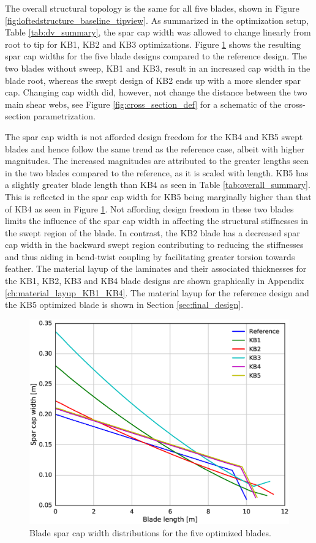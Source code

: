The overall structural topology is the same for all five blades, shown in Figure \ref{fig:loftedstructure_baseline_tipview}.
As summarized in the optimization setup, Table \ref{tab:dv_summary}, the spar cap width was allowed to change linearly from root to tip for KB1, KB2 and KB3 optimizations. Figure \ref{fig:capwidth} shows the resulting spar cap widths for the five blade designs compared to the reference design.
The two blades without sweep, KB1 and KB3, result in an increased cap width in the blade root, whereas the swept design of KB2 ends up with a more slender spar cap. Changing cap width did, however, not change the distance between the two main shear webs, see Figure \ref{fig:cross_section_def} for a schematic of the cross-section parametrization.

The spar cap width is not afforded design freedom for the KB4 and KB5 swept blades and hence follow the same trend as the reference case, albeit with higher magnitudes. The increased magnitudes are attributed to the greater lengths seen in the two blades compared to the reference, as it is scaled with length. KB5 has a slightly greater blade length than KB4 as seen in Table \ref{tab:overall_summary}. This is reflected in the spar cap width for KB5 being marginally higher than that of KB4 as seen in Figure \ref{fig:capwidth}. Not affording design freedom in these two blades limits the influence of the spar cap width in affecting the structural stiffnesses in the swept region of the blade. In contrast, the KB2 blade has a decreased spar cap width in the backward swept region contributing to reducing the stiffnesses and thus aiding in bend-twist coupling by facilitating greater torsion towards feather. 
The material layup of the laminates and their associated thicknesses for the KB1, KB2, KB3 and KB4 blade designs are shown graphically in Appendix \ref{ch:material_layup_KB1_KB4}. The material layup for the reference design and the KB5 optimized blade is shown in Section \ref{sec:final_design}.
\begin{figure}[pht]
\begin{center}
	\includegraphics[width=.85\linewidth]{figures/KBcomp_spar_cap_width.eps}
\end{center}
\caption{Blade spar cap width distributions for the five optimized blades.}
\label{fig:capwidth}
\end{figure}

